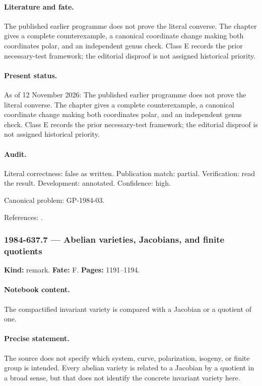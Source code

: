 \paragraph{Literature and fate.} The published earlier programme does not prove the literal converse. The chapter gives a complete counterexample, a canonical coordinate change making both coordinates polar, and an independent genus check. Class E records the prior necessary-test framework; the editorial disproof is not assigned historical priority.

\paragraph{Present status.} As of 12 November 2026: The published earlier programme does not prove the literal converse. The chapter gives a complete counterexample, a canonical coordinate change making both coordinates polar, and an independent genus check. Class E records the prior necessary-test framework; the editorial disproof is not assigned historical priority.

\paragraph{Audit.} Literal correctness: false as written. Publication match: partial. Verification: read the result. Development: annotated. Confidence: high.

\noindent Canonical problem: GP-1984-03.\par

\noindent References: \citep{adler1982kowalewski,adler1987quadrics}.\par

\subsubsection{1984-637.7 --- Abelian varieties, Jacobians, and finite quotients}

\label{item:1984-637.7}

\noindent\textbf{Kind:} remark. \textbf{Fate:} F. \textbf{Pages:} 1191--1194.\par

\paragraph{Notebook content.} The compactified invariant variety is compared with a Jacobian or a quotient of one.

\paragraph{Precise statement.} The source does not specify which system, curve, polarization, isogeny, or finite group is intended. Every abelian variety is related to a Jacobian by a quotient in a broad sense, but that does not identify the concrete invariant variety here.

